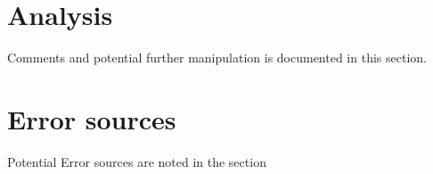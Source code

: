 \section{Analysis}

Comments and potential further manipulation is documented in this section. 

\section{Error sources}

Potential Error sources are noted in the section

